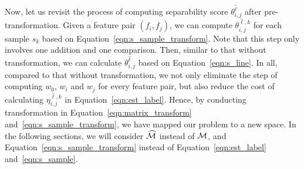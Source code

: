 
Now, let us revisit the process of computing separability score $\theta_{i,j}^{\hat{\ell}}$ after pre-transformation. Given a feature pair $(f_i,f_j)$, we can compute $\theta_{i,j}^{\hat{\ell},k}$ for each sample $s_k$ based on Equation~\ref{eqn:s_sample_transform}. Note that this step only involves one addition and one comparison. Then, similar to that without transformation, we can calculate $\theta_{i,j}^{\hat{\ell}}$ based on Equation~\ref{eqn:s_line}. In all, compared to that without transformation, we not only eliminate the step of computing $w_0$, $w_i$ and $w_j$ for every feature pair, but also reduce the cost of calculating $\eta_{i,j}^{\hat{\ell},k}$ in Equation~\ref{eqn:est_label}. Hence, by conducting transformation in Equation~\ref{eqn:matrix_transform} and~\ref{eqn:s_sample_transform}, we have mapped our problem to a new space. In the following sections, we will consider $\widehat{\mm}$ instead of $\mm$, and Equation~\ref{eqn:s_sample_transform} instead of Equation~\ref{eqn:est_label} and~\ref{eqn:s_sample}.

\begin{example}[Transformation]
\end{example}


